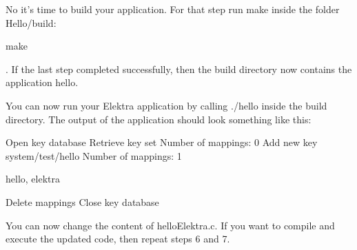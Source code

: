 \begin{DoxyEnumerate}
\item No it’s time to build your application. For that step run {\ttfamily make} inside the folder {\ttfamily Hello/build}\+:
\end{DoxyEnumerate}


\begin{DoxyCode}
make
\end{DoxyCode}


. If the last step completed successfully, then the build directory now contains the application {\ttfamily hello}.


\begin{DoxyEnumerate}
\item You can now run your Elektra application by calling {\ttfamily ./hello} inside the build directory. The output of the application should look something like this\+:
\end{DoxyEnumerate}


\begin{DoxyCode}
Open key database
Retrieve key set
Number of mappings: 0
Add new key system/test/hello
Number of mappings: 1

hello, elektra

Delete mappings
Close key database
\end{DoxyCode}



\begin{DoxyEnumerate}
\item You can now change the content of {\ttfamily hello\+Elektra.\+c}. If you want to compile and execute the updated code, then repeat steps 6 and 7. 
\end{DoxyEnumerate}